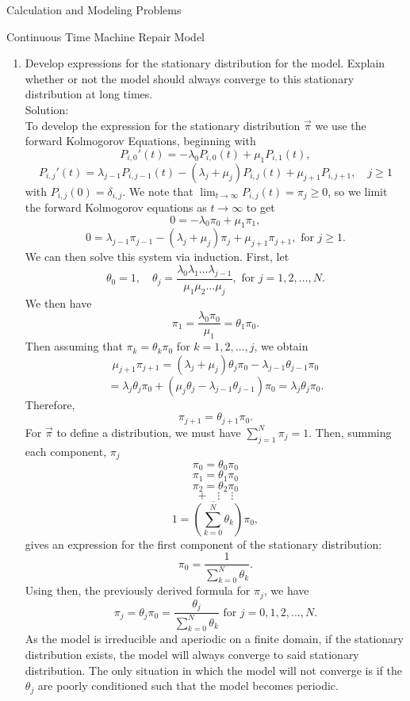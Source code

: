 \documentclass[12pt]{article}
\numberwithin{equation}{section}
\begin{document}
\begin{section}{Calculation and Modeling Problems}
\begin{subsection}{Continuous Time Machine Repair Model}
\begin{enumerate}
    \item Develop expressions for the stationary distribution for the model. Explain whether or not the model should always converge to this stationary distribution at long times.\\

        Solution:\\

        To develop the expression for the stationary distribution $\vec{\pi}$ we use the forward Kolmogorov Equations, beginning with
        $$P_{i,0}'(t)=-\lambda_0 P_{i,0}(t)+\mu_1P_{i,1}(t),$$
        $$P_{i,j}'(t)=\lambda_{j-1} P_{i,j-1}(t)-(\lambda_j+\mu_j)P_{i,j}(t)+\mu_{j+1}P_{i,j+1},\quad j\geq 1$$
        with $P_{i,j}(0)=\delta_{i,j}.$ We note that $\lim_{t\to\infty}P_{i,j}(t)=\pi_j\geq 0$, so we limit the forward Kolmogorov equations as $t\to\infty$ to get
        $$0=-\lambda_0\pi_0+\mu_1\pi_1,$$
        $$0=\lambda_{j-1}\pi_{j-1}-(\lambda_j+\mu_j)\pi_j+\mu_{j+1}\pi_{j+1}, \text{ for }j\geq 1.$$
        We can then solve this system via induction. First, let
        $$\theta_0=1,\quad \theta_j=\frac{\lambda_0\lambda_1\dots\lambda_{j-1}}{\mu_1\mu_2\dots\mu_j},\text{  for  }j=1,2,...,N.$$
        We then have
        $$\pi_1=\frac{\lambda_0\pi_0}{\mu_1}=\theta_1\pi_0.$$
        Then assuming that $\pi_k=\theta_k\pi_0$ for $k=1,2,...,j$, we obtain
        $$\mu_{j+1}\pi_{j+1}=(\lambda_j+\mu_j)\theta_j\pi_0-\lambda_{j-1}\theta_{j-1}\pi_0$$
        $$=\lambda_j\theta_j\pi_0+(\mu_j\theta_j-\lambda_{j-1}\theta_{j-1})\pi_0=\lambda_j\theta_j\pi_0.$$
        Therefore,
        $$\pi_{j+1}=\theta_{j+1}\pi_0.$$
        For $\vec{\pi}$ to define a distribution, we must have $\sum_{j=1}^N\pi_j=1$. Then, summing each component, $\pi_j$
        $$\pi_0=\theta_0\pi_0$$
        $$\pi_1=\theta_1\pi_0$$
        $$\pi_2=\theta_2\pi_0$$
        $$\underbar{+\quad\vdots\quad\vdots}$$
        $$1=\left(\sum_{k=0}^N\theta_k\right)\pi_0,$$
        gives an expression for the first component of the stationary distribution:
        $$\pi_0=\frac{1}{\sum_{k=0}^N\theta_k}.$$
        Using then, the previously derived formula for $\pi_j$, we have
        $$\pi_j=\theta_j\pi_0=\frac{\theta_j}{\sum_{k=0}^N\theta_k}\text{  for }j=0,1,2,...,N.$$
        As the model is irreducible and aperiodic on a finite domain, if the stationary distribution exists, the model will always converge to said stationary distribution. The only situation in which the model will not converge is if the $\theta_j$ are poorly conditioned such that the model becomes periodic.


\end{enumerate}
\end{subsection}
\end{section}
\end{document}
